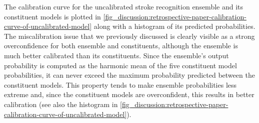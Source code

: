 The calibration curve for the uncalibrated stroke recognition ensemble and its constituent models is plotted in \cref{fig_discussion:retrospective-paper-calibration-curve-of-uncalibrated-model} along with a histogram of its predicted probabilities. The miscalibration issue that we previously discussed is clearly visible as a strong overconfidence for both ensemble and constituents, although the ensemble is much better calibrated than its constituents. Since the ensemble's output probability is computed as the harmonic mean of the five constituent model probabilities, it can never exceed the maximum probability predicted between the constituent models. This property tends to make ensemble probabilities less extreme and, since the constituent models are overconfident, this results in better calibration (see also the histogram in \cref{fig_discussion:retrospective-paper-calibration-curve-of-uncalibrated-model}). 

